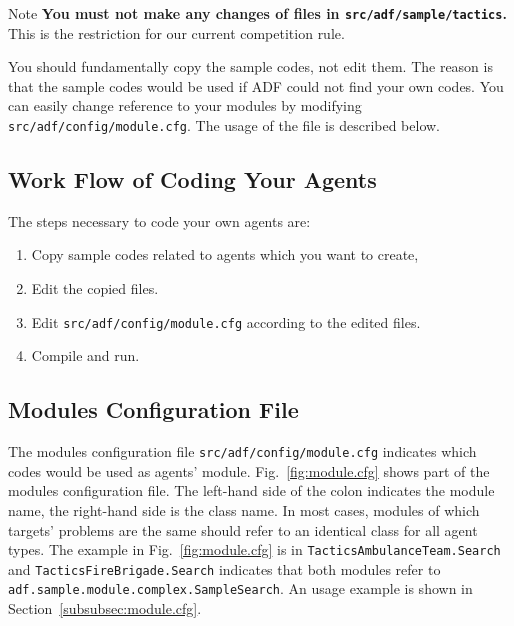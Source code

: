 \documentclass{article}
\begin{document}
\begin{itembox}[l]{Note}
{\bfseries You must not make any changes of files in \texttt{src/adf/sample/tactics}.} This is the restriction for our current competition rule.
\end{itembox}

You should fundamentally copy the sample codes, not edit them. The reason is that the sample codes would be used if ADF could not find your own codes. You can easily change reference to your modules by modifying \texttt{src/adf/config/module.cfg}. The usage of the file is described below.
\subsection{Work Flow of Coding Your Agents}
The steps necessary to code your own agents are:
\begin{enumerate}
 \item Copy sample codes related to agents which you want to create,
 \item Edit the copied files.
 \item Edit \texttt{src/adf/config/module.cfg} according to the edited files.
 \item Compile and run.
\end{enumerate}
\subsection{Modules Configuration File}
The modules configuration file \texttt{src/adf/config/module.cfg} indicates which codes would be used as agents' module. Fig.~\ref{fig:module.cfg} shows part of the modules configuration file. The left-hand side of the colon indicates the module name, the right-hand side is the class name. In most cases, modules of which targets' problems are the same should refer to an identical class for all agent types. The example in Fig.~\ref{fig:module.cfg} is in \texttt{TacticsAmbulanceTeam.Search} and \texttt{TacticsFireBrigade.Search} indicates that both modules refer to \\
\texttt{adf.sample.module.complex.SampleSearch}. An usage example is shown in Section~\ref{subsubsec:module.cfg}.
\end{document}
